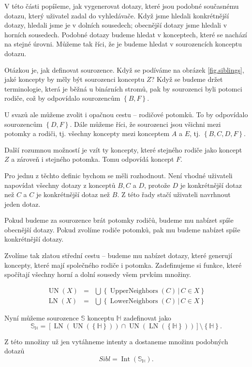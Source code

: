 \documentclass[12pt]{article}
\newcommand{\sep}{\,|\,}
\newcommand{\addh}[1]{\left[#1\right]}
\newcommand{\adds}[1]{\left\{#1\right\}}
\DeclareMathOperator{\intfca}{Int}
\DeclareMathOperator{\lowerneighbors}{LowerNeighbors}
\DeclareMathOperator{\upperneighbors}{UpperNeighbors}
\DeclareMathOperator{\unfca}{UN}
\DeclareMathOperator{\lnfca}{LN}
\newcommand{\hledany}{\mathbb{H}}
\newcommand{\sibl}{\mathbb{S}}
\begin{document}
V této části popíšeme, jak vygenerovat dotazy, které jsou podobné současnému dotazu, který uživatel zadal do vyhledávače. Když jsme hledali konkrétnější dotazy, hledali jsme je v dolních sousedech; obecnější dotazy jsme hledali v horních sousedech. Podobné dotazy budeme hledat v konceptech, které se nachází na stejné úrovni. Můžeme tak říci, že je budeme hledat v sourozencích konceptu dotazu. 

Otázkou je, jak definovat sourozence. Když se podíváme na obrázek \ref{fig.siblings}, jaké koncepty by měly být sourozenci konceptu $Z$? Když se budeme držet terminologie, která je běžná u binárních stromů, pak by sourozenci byli potomci rodiče, což by odpovídalo sourozencům $\adds{B, F}$. 

U svazů ale můžeme zvolit i opačnou cestu -- rodičové potomků. To by odpovídalo sourozencům $\adds{D, F}$. Dále můžeme říci, že sourozenci jsou všichni mezi potomky a rodiči, tj. všechny koncepty mezi konceptem $A$ a $E$, tj. $\adds{B, C, D, F}$. 

Další rozumnou možností je vzít ty koncepty, které stejného rodiče jako koncept $Z$ a zároveň i stejného potomka. Tomu odpovídá koncept $F$.

Pro jednu z těchto definic bychom se měli rozhodnout. Není vhodné uživateli napovídat všechny dotazy z konceptů $B, C$ a $D$, protože $D$ je konkrétnější dotaz než $C$ a $C$ je konkrétnější dotaz než $B$. Z této řady stačí uživateli navrhnout jeden dotaz. 

Pokud budeme za sourozence brát potomky rodičů, budeme mu nabízet spíše obecnější dotazy. Pokud zvolíme rodiče potomků, pak mu budeme nabízet spíše konkrétnější dotazy. 

Zvolíme tak zlatou střední cestu -- budeme mu nabízet dotazy, které generují koncepty, které mají společného rodiče i potomka. Zadefinujeme si funkce, které spočítají všechny horní a dolní sousedy všem prvkům množiny.

\begin{eqnarray}
\unfca(X)&=&\bigcup\adds{\upperneighbors(C)\sep C\in X}\\
\lnfca(X)&=&\bigcup\adds{\lowerneighbors(C)\sep C\in X}
\end{eqnarray}

Nyní můžeme sourozence $\sibl$ konceptu $\hledany$ zadefinovat jako
$$
\sibl_\hledany = \addh{\lnfca(\unfca(\adds{\hledany}))\cap\unfca(\lnfca(\adds{\hledany}))}\setminus\adds{\hledany}.
$$

Z této množiny už jen vytáhneme intenty a dostaneme množinu podobných dotazů
$$
Sibl=\intfca(\sibl_\hledany).
$$
\end{document}
